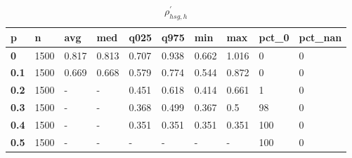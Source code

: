 \begin{table}[h]
 \centering 
\footnotesize
\caption{$\rho_{hsg,h}^\prime $}
\label{tab:alphahsgh}
\begin{tabular}[h]{|l|l|l|l|l|l|l|l|l|l|
    } \hline
\textbf{ p} & \textbf{ n} & \textbf{ avg} & \textbf{ med} & \textbf{ q025} & \textbf{ q975} & \textbf{ min} & \textbf{ max} & \textbf{ pct\_0} & \textbf{ pct\_nan}
    \\ \hline
  \textbf{  0} & 1500 & 0.817 & 0.813 & 0.707 & 0.938 & 0.662 & 1.016 &   0 & 0
    \\ \hline
  \textbf{0.1} & 1500 & 0.669 & 0.668 & 0.579 & 0.774 & 0.544 & 0.872 &   0 & 0
    \\ \hline
  \textbf{0.2} & 1500 & - & - & 0.451 & 0.618 & 0.414 & 0.661 &   1 & 0
    \\ \hline
  \textbf{0.3} & 1500 & - & - & 0.368 & 0.499 & 0.367 &   0.5 &  98 & 0
    \\ \hline
  \textbf{0.4} & 1500 & - & - & 0.351 & 0.351 & 0.351 & 0.351 & 100 & 0
    \\ \hline
  \textbf{0.5} & 1500 & - & - & - & - & - & - & 100 & 0
    \\ \hline
 \end{tabular}
 \end{table}
